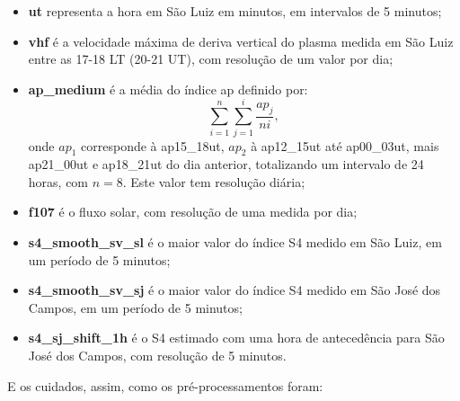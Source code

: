 \begin{itemize}
\item {\bf ut} representa a hora em São Luiz em minutos, em intervalos de 5 minutos;
\item {\bf vhf} é a velocidade máxima de deriva vertical do plasma medida em São Luiz entre as 17-18 LT (20-21 UT), com resolução de um valor por dia;
\item {\bf ap\_medium} é a média do índice ap definido por:
\begin{equation}\label{eq:ap}
\sum_{i=1}^{n}\sum_{j=1}^{i}\frac{ap_{j}}{ni}\mbox{,}~
\end{equation}
onde $ap_1$ corresponde à ap15\_18ut, $ap_2$ à ap12\_15ut até ap00\_03ut, mais ap21\_00ut e ap18\_21ut do dia anterior, totalizando um intervalo de 24 horas, com $n=8$. Este valor tem resolução diária;
\item {\bf f107} é o fluxo solar, com resolução de uma medida por dia;
\item {\bf s4\_smooth\_sv\_sl} é o maior valor do índice S4 medido em São Luiz, em um período de 5 minutos;
\item {\bf s4\_smooth\_sv\_sj} é o maior valor do índice S4 medido em São José dos Campos, em um período de 5 minutos;
\item {\bf s4\_sj\_shift\_1h} é o S4 estimado com uma hora de antecedência para São José dos Campos, com resolução de 5 minutos.
\end{itemize}

E os cuidados, assim, como os pré-processamentos foram:

